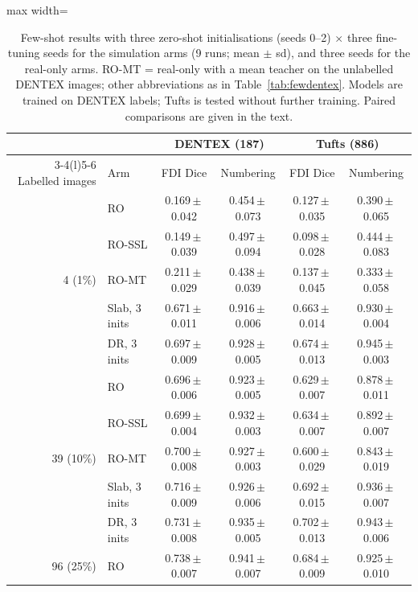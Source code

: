 \documentclass[preprint,12pt]{elsarticle}
\newcommand{\pmsd}[2]{#1\,$\pm$\,#2}
\begin{document}
\begin{table}[t]
\centering\small
\caption{Few-shot results with three zero-shot initialisations (seeds 0--2) $\times$ three fine-tuning seeds for the
simulation arms (9 runs; mean $\pm$ sd), and three seeds for the real-only arms. RO-MT = real-only with a mean teacher on
the unlabelled DENTEX images; other abbreviations as in Table~\ref{tab:fewdentex}. Models are trained on DENTEX labels;
Tufts is tested without further training. Paired comparisons are given in the text.}
\label{tab:inits}
\begin{adjustbox}{max width=\linewidth}
\begin{tabular}{@{}rlcccc@{}}
\toprule
& & \multicolumn{2}{c}{DENTEX (187)} & \multicolumn{2}{c}{Tufts (886)} \\
\cmidrule(lr){3-4}\cmidrule(l){5-6}
Labelled images & Arm & FDI Dice & Numbering & FDI Dice & Numbering \\
\midrule
\multirow{5}{*}{4 (1\%)} & RO & \pmsd{0.169}{0.042} & \pmsd{0.454}{0.073} & \pmsd{0.127}{0.035} & \pmsd{0.390}{0.065} \\
 & RO-SSL & \pmsd{0.149}{0.039} & \pmsd{0.497}{0.094} & \pmsd{0.098}{0.028} & \pmsd{0.444}{0.083} \\
 & RO-MT & \pmsd{0.211}{0.029} & \pmsd{0.438}{0.039} & \pmsd{0.137}{0.045} & \pmsd{0.333}{0.058} \\
 & Slab, 3 inits & \pmsd{0.671}{0.011} & \pmsd{0.916}{0.006} & \pmsd{0.663}{0.014} & \pmsd{0.930}{0.004} \\
 & DR, 3 inits & \pmsd{0.697}{0.009} & \pmsd{0.928}{0.005} & \pmsd{0.674}{0.013} & \pmsd{0.945}{0.003} \\
\midrule
\multirow{5}{*}{39 (10\%)} & RO & \pmsd{0.696}{0.006} & \pmsd{0.923}{0.005} & \pmsd{0.629}{0.007} & \pmsd{0.878}{0.011} \\
 & RO-SSL & \pmsd{0.699}{0.004} & \pmsd{0.932}{0.003} & \pmsd{0.634}{0.007} & \pmsd{0.892}{0.007} \\
 & RO-MT & \pmsd{0.700}{0.008} & \pmsd{0.927}{0.003} & \pmsd{0.600}{0.029} & \pmsd{0.843}{0.019} \\
 & Slab, 3 inits & \pmsd{0.716}{0.009} & \pmsd{0.926}{0.006} & \pmsd{0.692}{0.015} & \pmsd{0.936}{0.007} \\
 & DR, 3 inits & \pmsd{0.731}{0.008} & \pmsd{0.935}{0.005} & \pmsd{0.702}{0.013} & \pmsd{0.943}{0.006} \\
\midrule
\multirow{5}{*}{96 (25\%)} & RO & \pmsd{0.738}{0.007} & \pmsd{0.941}{0.007} & \pmsd{0.684}{0.009} & \pmsd{0.925}{0.010} \\

\end{tabular}
\end{adjustbox}
\end{table}
\end{document}
